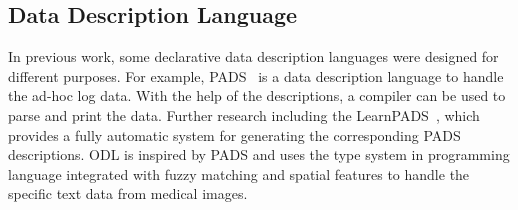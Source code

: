 




\subsection{Data Description Language}
In previous work, some declarative data description languages
were designed for different purposes.
For example, PADS~\cite{fisher2005pads} is a data description language to
handle the ad-hoc log data.
With the help of the descriptions,
a compiler can be used to parse and print the data.
Further research including
the LearnPADS~\cite{fisher2008dirt,fisher2008learnpads},
which provides a fully automatic
system for generating the corresponding PADS descriptions.
ODL is inspired by PADS and uses the type system in programming
language integrated with fuzzy matching and spatial features
to handle the specific text data from medical images.

